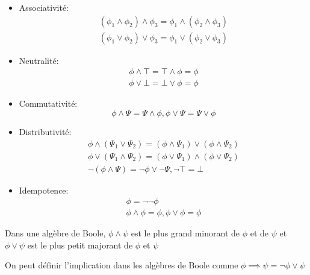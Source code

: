 \documentclass[math, info]{cours}
\begin{document}
\begin{multicols}{2}
	\begin{itemize}
		\item Associativité:
		      \begin{align*}
			      \left(\phi_{1}\land\phi_{2}\right) \land \phi_{3} = \phi_{1}\land\left(\phi_{2}\land \phi_{3}\right) \\
			      \left(\phi_{1}\lor\phi_{2}\right) \lor \phi_{3} = \phi_{1}\lor\left(\phi_{2}\lor \phi_{3}\right)
		      \end{align*}
		\item Neutralité:
		      \begin{align*}
			      \phi \land \top = \top \land \phi = \phi \\
			      \phi \lor \bot = \bot \lor \phi = \phi
		      \end{align*}
		\item Commutativité:
		      \begin{equation*}
			      \phi \land \Psi = \Psi \land \phi, \phi \lor \Psi = \Psi \lor \phi
		      \end{equation*}
		\item Distributivité:
		      \begin{align*}
			      \phi \land \left(\Psi_{1} \lor \Psi_{2}\right) = \left(\phi \land \Psi_{1}\right) \lor \left(\phi \land \Psi_{2}\right) \\
			      \phi \lor \left(\Psi_{1} \land \Psi_{2}\right) = \left(\phi \lor \Psi_{1}\right) \land \left(\phi \lor \Psi_{2}\right)  \\
			      \lnot\left(\phi \land \Psi\right) = \lnot\phi \lor \lnot \Psi, \lnot\top = \bot
		      \end{align*}
		\item Idempotence:
		      \begin{align*}
			      \phi = \lnot\lnot \phi \\
			      \phi \land \phi = \phi, \phi \lor \phi = \phi
		      \end{align*}
	\end{itemize}
\end{multicols}
Dans une algèbre de Boole, $\phi \land \psi$ est le plus grand minorant de $\phi$ et de $\psi$ et $\phi \lor \psi$ est le plus petit majorant de $\phi$ et $\psi$
\begin{remarque}
	On peut définir l'implication dans les algèbres de Boole comme $\phi \implies \psi = \lnot\phi \lor \psi$
	\label{rem:implicationboole}
\end{remarque}
\end{document}
